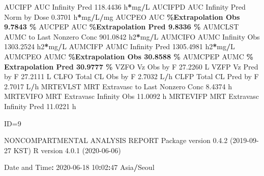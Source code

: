 \documentclass[
  10pt,
]{krantz}
\makeatletter
\newenvironment{Shaded}{\begin{snugshade}}{\end{snugshade}}
\newcommand{\DecValTok}[1]{\textcolor[rgb]{0.00,0.00,0.81}{#1}}
\newcommand{\FloatTok}[1]{\textcolor[rgb]{0.00,0.00,0.81}{#1}}
\newcommand{\NormalTok}[1]{#1}
\newcommand{\OperatorTok}[1]{\textcolor[rgb]{0.81,0.36,0.00}{\textbf{#1}}}
\newcommand{\StringTok}[1]{\textcolor[rgb]{0.31,0.60,0.02}{#1}}
\newenvironment{kframe}{%
\medskip{}
\setlength{\fboxsep}{.8em}
 \def\at@end@of@kframe{}%
 \ifinner\ifhmode%
  \def\at@end@of@kframe{\end{minipage}}%
  \begin{minipage}{\columnwidth}%
 \fi\fi%
 \def\FrameCommand##1{\hskip\@totalleftmargin \hskip-\fboxsep
 \colorbox{shadecolor}{##1}\hskip-\fboxsep
     \hskip-\linewidth \hskip-\@totalleftmargin \hskip\columnwidth}%
 \MakeFramed {\advance\hsize-\width
   \@totalleftmargin\z@ \linewidth\hsize
   \@setminipage}}%
 {\par\unskip\endMakeFramed%
 \at@end@of@kframe}
\renewenvironment{Shaded}{\begin{kframe}}{\end{kframe}}
\makeatother
\begin{document}
\begin{Shaded}
\begin{Highlighting}[]
\NormalTok{AUCIFP     AUC Infinity Pred                             }\FloatTok{118.4436}\NormalTok{ h}\OperatorTok{*}\NormalTok{mg}\OperatorTok{/}\NormalTok{L}
\NormalTok{AUCIFPD    AUC Infinity Pred Norm by Dose                  }\FloatTok{0.3701}\NormalTok{ h}\OperatorTok{*}\NormalTok{mg}\OperatorTok{/}\NormalTok{L}\OperatorTok{/}\NormalTok{mg}
\NormalTok{AUCPEO     AUC }\OperatorTok{\%Extrapolation Obs                          9.7843 \%}
\NormalTok{AUCPEP     AUC }\OperatorTok{\%Extrapolation Pred                         9.8336 \%}
\NormalTok{AUMCLST    AUMC to Last Nonzero Conc                     }\FloatTok{901.0842}\NormalTok{ h2}\OperatorTok{*}\NormalTok{mg}\OperatorTok{/}\NormalTok{L}
\NormalTok{AUMCIFO    AUMC Infinity Obs                            }\FloatTok{1303.2524}\NormalTok{ h2}\OperatorTok{*}\NormalTok{mg}\OperatorTok{/}\NormalTok{L}
\NormalTok{AUMCIFP    AUMC Infinity Pred                           }\FloatTok{1305.4981}\NormalTok{ h2}\OperatorTok{*}\NormalTok{mg}\OperatorTok{/}\NormalTok{L}
\NormalTok{AUMCPEO    AUMC }\OperatorTok{\%Extrapolation Obs                        30.8588 \%}
\NormalTok{AUMCPEP    AUMC }\OperatorTok{\% Extrapolation Pred                      30.9777 \%}
\NormalTok{VZFO       Vz Obs by F                                    }\FloatTok{27.2260}\NormalTok{ L}
\NormalTok{VZFP       Vz Pred by F                                   }\FloatTok{27.2111}\NormalTok{ L}
\NormalTok{CLFO       Total CL Obs by F                               }\FloatTok{2.7032}\NormalTok{ L}\OperatorTok{/}\NormalTok{h}
\NormalTok{CLFP       Total CL Pred by F                              }\FloatTok{2.7017}\NormalTok{ L}\OperatorTok{/}\NormalTok{h}
\NormalTok{MRTEVLST   MRT Extravasc to Last Nonzero Conc              }\FloatTok{8.4374}\NormalTok{ h}
\NormalTok{MRTEVIFO   MRT Extravasc Infinity Obs                     }\FloatTok{11.0092}\NormalTok{ h}
\NormalTok{MRTEVIFP   MRT Extravasc Infinity Pred                    }\FloatTok{11.0221}\NormalTok{ h}





\NormalTok{ID=}\DecValTok{9}

\NormalTok{                        NONCOMPARTMENTAL ANALYSIS REPORT}
\NormalTok{                       Package version }\DecValTok{0}\NormalTok{.}\FloatTok{4.2}\NormalTok{ (}\DecValTok{2019{-}09{-}27}\NormalTok{ KST)}
\NormalTok{                          R version }\DecValTok{4}\NormalTok{.}\FloatTok{0.1}\NormalTok{ (}\DecValTok{2020{-}06{-}06}\NormalTok{)}

\NormalTok{Date and Time}\OperatorTok{:}\StringTok{ }\DecValTok{2020{-}06{-}18} \DecValTok{10}\OperatorTok{:}\DecValTok{02}\OperatorTok{:}\DecValTok{47}\NormalTok{ Asia}\OperatorTok{/}\NormalTok{Seoul}


\end{Highlighting}
\end{Shaded}
\end{document}
